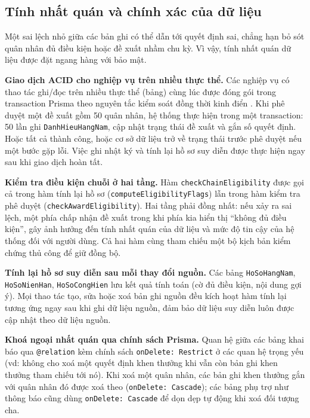 \documentclass[../DoAn.tex]{subfiles}
\begin{document}
\subsection{Tính nhất quán và chính xác của dữ liệu}
\label{subsection:2.4.3}

Một sai lệch nhỏ giữa các bản ghi có thể dẫn tới quyết định sai, chẳng hạn bỏ sót quân nhân đủ điều kiện hoặc đề xuất nhầm chu kỳ. Vì vậy, tính nhất quán dữ liệu được đặt ngang hàng với bảo mật.

\textbf{Giao dịch ACID cho nghiệp vụ trên nhiều thực thể.} Các nghiệp vụ có thao tác ghi/đọc trên nhiều thực thể (bảng) cùng lúc được đóng gói trong transaction Prisma theo nguyên tắc kiểm soát đồng thời kinh điển \cite{harkey1981serializability}. Khi phê duyệt một đề xuất gồm 50 quân nhân, hệ thống thực hiện trong một transaction: 50 lần ghi \texttt{DanhHieuHangNam}, cập nhật trạng thái đề xuất và gắn số quyết định. Hoặc tất cả thành công, hoặc cơ sở dữ liệu trở về trạng thái trước phê duyệt nếu một bước gặp lỗi. Việc ghi nhật ký và tính lại hồ sơ suy diễn được thực hiện ngay sau khi giao dịch hoàn tất.

\textbf{Kiểm tra điều kiện chuỗi ở hai tầng.} Hàm \texttt{checkChainEligibility} được gọi cả trong hàm tính lại hồ sơ (\texttt{computeEligibilityFlags}) lẫn trong hàm kiểm tra phê duyệt (\texttt{checkAwardEligibility}). Hai tầng phải đồng nhất: nếu xảy ra sai lệch, một phía chấp nhận đề xuất trong khi phía kia hiển thị ``không đủ điều kiện'', gây ảnh hưởng đến tính nhất quán của dữ liệu và mức độ tin cậy của hệ thống đối với người dùng. Cả hai hàm cùng tham chiếu một bộ kịch bản kiểm chứng thủ công để giữ đồng bộ.

\textbf{Tính lại hồ sơ suy diễn sau mỗi thay đổi nguồn.} Các bảng \texttt{HoSoHangNam}, \texttt{HoSoNienHan}, \texttt{HoSoCongHien} lưu kết quả tính toán (cờ đủ điều kiện, nội dung gợi ý). Mọi thao tác tạo, sửa hoặc xoá bản ghi nguồn đều kích hoạt hàm tính lại tương ứng ngay sau khi ghi dữ liệu nguồn, đảm bảo dữ liệu suy diễn luôn được cập nhật theo dữ liệu nguồn.

\textbf{Khoá ngoại nhất quán qua chính sách Prisma.} Quan hệ giữa các bảng khai báo qua \texttt{@relation} kèm chính sách \texttt{onDelete: Restrict} ở các quan hệ trọng yếu (vd: không cho xoá một quyết định khen thưởng khi vẫn còn bản ghi khen thưởng tham chiếu tới nó). Khi xoá một quân nhân, các bản ghi khen thưởng gắn với quân nhân đó được xoá theo (\texttt{onDelete: Cascade}); các bảng phụ trợ như thông báo cũng dùng \texttt{onDelete: Cascade} để dọn dẹp tự động khi xoá đối tượng cha.
\end{document}
